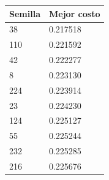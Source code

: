 \documentclass{article}
\begin{document}
\begin{table}[!htb]
\begin{minipage}{\linewidth}
\begin{tabular}{l|l}
        Semilla & Mejor costo \\
        \hline
        38      & 0.217518 \\
        \hline
        110     & 0.221592 \\
        \hline
        42      & 0.222277 \\
        \hline
        8       & 0.223130 \\
        \hline
        224     & 0.223914 \\
        \hline
        23      & 0.224230 \\
        \hline
        124     & 0.225127 \\
        \hline
        55      & 0.225244 \\
        \hline
        232     & 0.225285 \\
        \hline
        216     & 0.225676 \\
      \end{tabular}
    \end{minipage} 
  \end{table}
\end{document}
